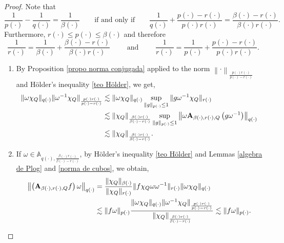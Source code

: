 \documentclass[a4paper,11pt,reqno]{amsart}
\theoremstyle{plain}
\numberwithin{equation}{section}
\theoremstyle{definition}
\begin{document}
\begin{proof}
	Note that $$\frac{1}{{p(\cdot)}}-\frac{1}{{q(\cdot)}}=\frac{1}{{\beta(\cdot)}}\qquad \text{if and only if}\qquad
	\frac{1}{{q(\cdot)}}+\frac{{p(\cdot)}-{r(\cdot)}}{{p(\cdot)}{r(\cdot)}}=\frac{{\beta(\cdot)}-{r(\cdot)}}{{\beta(\cdot)}{r(\cdot)}}.$$
	Furthermore, ${r(\cdot)}\leq{p(\cdot)}\leq{\beta(\cdot)}$ and therefore $$\frac{1}{{r(\cdot)}}=\frac{1}{{\beta(\cdot)}}+\frac{{\beta(\cdot)}
		-{r(\cdot)}}{{\beta(\cdot)}{r(\cdot)}}\qquad\text{ and }\qquad\frac{1}{{r(\cdot)}}=\frac{1}{{p(\cdot)}}+\frac{{p(\cdot)}
		-{r(\cdot)}}{{p(\cdot)}{r(\cdot)}}.$$
	\begin{enumerate}
		\item By Proposition \ref{propo norma conjugada} applied to the norm $\left\|\cdot\right\|_{\frac{{p(\cdot)}{r(\cdot)}}{{p(\cdot)}-{r(\cdot)}}}$ and Hölder's inequality \ref{teo Hölder}, we get,
		\begin{align*}
			\|\omega\chi_Q\|_{q(\cdot)}\|\omega^{-1}\chi_Q\|_\frac{{p(\cdot)}{r(\cdot)}}{{p(\cdot)}-{r(\cdot)}}&\lesssim\|\omega\chi_Q\|_{q(\cdot)}\sup_{\|g\|_{p(\cdot)} \leq1}\|g\omega^{-1}\chi_Q\|_{r(\cdot)}\\
			&\lesssim \|\chi_Q\|_{\frac{{\beta(\cdot)}{r(\cdot)}}{{\beta(\cdot)}-{r(\cdot)}}}\sup_{\|g\|_{p(\cdot)} \leq1} \left\|\omega {\bf A}_{{\beta(\cdot)},{r(\cdot)},Q}\left(g\omega^{-1}\right)\right\|_{q(\cdot)}\\
			&\lesssim\|\chi_Q\|_{\frac{\beta(\cdot)r(\cdot)}{\beta(\cdot)-r(\cdot)}}.
		\end{align*}
	
	
		\item If $\omega\in\mathbb{A}_{{q(\cdot)},\frac{{\beta(\cdot)}{r(\cdot)}}{{\beta(\cdot)}-{r(\cdot)}}}$, by Hölder's inequality \ref{teo Hölder} and Lemmas \ref{algebra de Plog} and \ref{norma de cubos}, we obtain,
			\begin{align*}
			\left\| \left({\bf A}_{{\beta(\cdot)},{r(\cdot)},Q}f\right)\omega\right\|_{q(\cdot)}&=\frac{\|\chi_Q\|_{\beta(\cdot)}}{\|\chi_Q\|_{r(\cdot)}}\|f\chi_Q \omega\omega^{-1}\|_{r(\cdot)}\|\omega\chi_Q\|_{q(\cdot)}\\
			&\lesssim\|f\omega\|_{p(\cdot)} \frac{\|\omega\chi_Q\|_{q(\cdot)}\|\omega^{-1}\chi_Q\|_{\frac{{p(\cdot)}{r(\cdot)}}{{p(\cdot)}-{r(\cdot)}}}}{\|\chi_Q\|_{\frac{{\beta(\cdot)}{r(\cdot)}}{{\beta(\cdot)}-{r(\cdot)}}}}\lesssim \|f\omega\|_{p(\cdot)}.
		\end{align*}
	\end{enumerate}
\end{proof}
\end{document}
